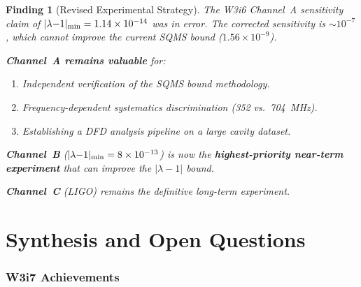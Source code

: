 \documentclass[11pt]{article}
\newtheorem{finding}{Finding}
\newcommand{\ee}[1]{\times 10^{#1}}
\newcommand{\lamdiff}{|\lambda{-}1|}
\begin{document}
\begin{finding}[Revised Experimental Strategy]
\label{find:revised-strategy}
The W3i6 Channel~A sensitivity claim of $\lamdiff_{\rm min} = 1.14\ee{-14}$
was in error. The corrected sensitivity is $\sim 10^{-7}$, which cannot
improve the current SQMS bound ($1.56\ee{-9}$).

\textbf{Channel~A remains valuable} for:
\begin{enumerate}[nosep]
\item Independent verification of the SQMS bound methodology.
\item Frequency-dependent systematics discrimination (352 vs.\ 704~MHz).
\item Establishing a DFD analysis pipeline on a large cavity dataset.
\end{enumerate}

\textbf{Channel~B} ($\lamdiff_{\rm min} = 8\ee{-13}$) is now the
\textbf{highest-priority near-term experiment} that can improve the
$\lamdiff$ bound.

\textbf{Channel~C} (LIGO) remains the definitive long-term experiment.
\end{finding}


\newpage
\part{Synthesis and Open Questions}
\label{part:synthesis}

\section{W3i7 Achievements}
\label{sec:achievements}
\end{document}
